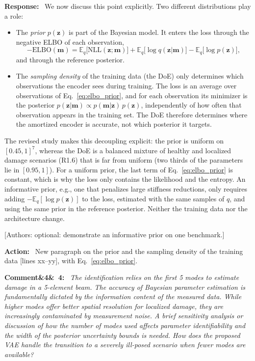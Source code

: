 \documentclass[11pt]{article}
\newenvironment{rcomment}[1]{\par\bigskip\noindent\textbf{Comment\ifx&#1&\else\ #1\fi:}\ \itshape}{\par}
\newenvironment{response}{\par\smallskip\noindent\color{resp}\textbf{Response:}\ }{\par}
\newenvironment{action}{\par\smallskip\noindent\color{resp}\textbf{Action:}\ }{\par}
\newcommand{\authornote}[1]{\textcolor{note}{\textsf{[Authors: #1]}}}
\newcommand{\tbd}[1]{\textcolor{note}{\textsf{[#1]}}}
\newcommand{\lines}[1]{\tbd{lines #1}}
\newcommand{\m}{\mathbf{m}}
\newcommand{\z}{\mathbf{z}}
\begin{document}
\begin{response}
We now discuss this point explicitly. Two different distributions play a
role:
\begin{itemize}[leftmargin=*]
\item The \emph{prior} $p(\z)$ is part of the Bayesian model. It enters the loss through the negative ELBO of each
observation,
\begin{equation}
-\mathrm{ELBO}(\m)=\mathbb{E}_q\big[\mathrm{NLL}(\z;\m)\big]+\mathbb{E}_q\big[\log q(\z|\m)\big]
-\mathbb{E}_q\big[\log p(\z)\big],
\label{eq:elbo_prior}
\end{equation}
and through the reference posterior.
\item The \emph{sampling density} of the training data (the DoE) only determines which observations the encoder sees
during training. The loss is an average over observations of Eq.~\eqref{eq:elbo_prior}, and for each observation its
minimizer is the posterior $p(\z|\m)\propto p(\m|\z)\,p(\z)$, independently of how often that observation appears in the
training set. The DoE therefore determines where the amortized encoder is accurate, not which posterior it targets.
\end{itemize}
The revised study makes this decoupling explicit: the prior is uniform on $[0.45,1]^7$, whereas the DoE is a balanced
mixture of healthy and localized damage scenarios (R1.6) that is far from uniform (two thirds of the parameters lie in
$[0.95,1]$). For a uniform prior, the last term of Eq.~\eqref{eq:elbo_prior} is constant, which is why the loss only
contains the likelihood and the entropy. An informative prior, e.g., one that penalizes large stiffness reductions,
only requires adding $-\mathbb{E}_q[\log p(\z)]$ to the loss, estimated with the same samples of $q$, and using the same
prior in the reference posterior. Neither the training data nor the architecture change.
\end{response}
\authornote{optional: demonstrate an informative prior on one benchmark.}

\begin{action}
New paragraph on the prior and the sampling density of the training data \lines{xx--yy}, with
Eq.~\eqref{eq:elbo_prior}.
\end{action}

\begin{rcomment}{4}
The identification relies on the first 5 modes to estimate damage in a 5-element beam. The accuracy of Bayesian
parameter estimation is fundamentally dictated by the information content of the measured data. While higher modes
offer better spatial resolution for localized damage, they are increasingly contaminated by measurement noise. A brief
sensitivity analysis or discussion of how the number of modes used affects parameter identifiability and the width of
the posterior uncertainty bounds is needed. How does the proposed VAE handle the transition to a severely ill-posed
scenario when fewer modes are available?
\end{rcomment}
\end{document}
